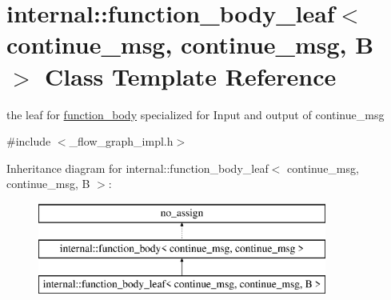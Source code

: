 \hypertarget{classinternal_1_1function__body__leaf_3_01continue__msg_00_01continue__msg_00_01B_01_4}{}\section{internal\+:\+:function\+\_\+body\+\_\+leaf$<$ continue\+\_\+msg, continue\+\_\+msg, B $>$ Class Template Reference}
\label{classinternal_1_1function__body__leaf_3_01continue__msg_00_01continue__msg_00_01B_01_4}


the leaf for \hyperlink{classinternal_1_1function__body}{function\+\_\+body} specialized for Input and output of continue\+\_\+msg  




{\ttfamily \#include $<$\+\_\+flow\+\_\+graph\+\_\+impl.\+h$>$}

Inheritance diagram for internal\+:\+:function\+\_\+body\+\_\+leaf$<$ continue\+\_\+msg, continue\+\_\+msg, B $>$\+:\begin{figure}[H]
\begin{center}
\leavevmode
\includegraphics[height=3.000000cm]{classinternal_1_1function__body__leaf_3_01continue__msg_00_01continue__msg_00_01B_01_4}
\end{center}
\end{figure}

